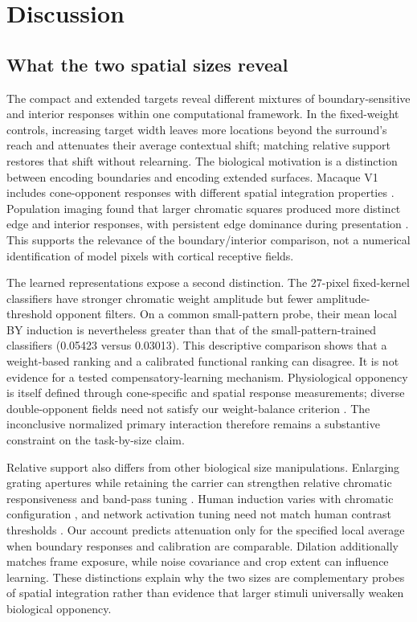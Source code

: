 \documentclass[authoryear,preprint,review,12pt]{elsarticle}
\begin{document}
\section{Discussion}\label{sec:discussion}
\subsection{What the two spatial sizes reveal}
The compact and extended targets reveal different mixtures of boundary-sensitive and interior responses within one computational framework. In the fixed-weight controls, increasing target width leaves more locations beyond the surround's reach and attenuates their average contextual shift; matching relative support restores that shift without relearning. The biological motivation is a distinction between encoding boundaries and encoding extended surfaces. Macaque V1 includes cone-opponent responses with different spatial integration properties \citep{johnson2008orientation,conway2006spatiotemporal}. Population imaging found that larger chromatic squares produced more distinct edge and interior responses, with persistent edge dominance during presentation \citep{zweig2015surfaces}. This supports the relevance of the boundary/interior comparison, not a numerical identification of model pixels with cortical receptive fields.

The learned representations expose a second distinction. The 27-pixel fixed-kernel classifiers have stronger chromatic weight amplitude but fewer amplitude-threshold opponent filters. On a common small-pattern probe, their mean local BY induction is nevertheless greater than that of the small-pattern-trained classifiers (0.05423 versus 0.03013). This descriptive comparison shows that a weight-based ranking and a calibrated functional ranking can disagree. It is not evidence for a tested compensatory-learning mechanism. Physiological opponency is itself defined through cone-specific and spatial response measurements; diverse double-opponent fields need not satisfy our weight-balance criterion \citep{de2021spatial,de2022coding}. The inconclusive normalized primary interaction therefore remains a substantive constraint on the task-by-size claim.

Relative support also differs from other biological size manipulations. Enlarging grating apertures while retaining the carrier can strengthen relative chromatic responsiveness and band-pass tuning \citep{solomon2004surrounds}. Human induction varies with chromatic configuration \citep{canham2021size,kanematsu2022size}, and network activation tuning need not match human contrast thresholds \citep{songlin2026chromatic}. Our account predicts attenuation only for the specified local average when boundary responses and calibration are comparable. Dilation additionally matches frame exposure, while noise covariance and crop extent can influence learning. These distinctions explain why the two sizes are complementary probes of spatial integration rather than evidence that larger stimuli universally weaken biological opponency.
\end{document}
